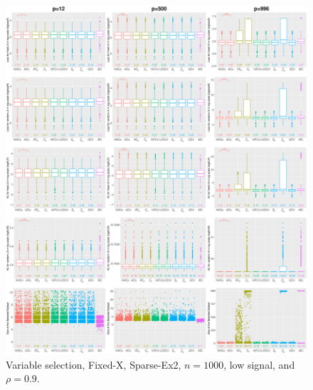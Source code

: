 \begin{figure}[!ht]
\centering
\includegraphics[width=\textwidth]{figures/supplement/fixedx/subset_selection/Sparse-Ex2_n1000_lsnr_rho09.eps}
\caption{Variable selection, Fixed-X, Sparse-Ex2, $n=1000$, low signal, and $\rho=0.9$.}
\end{figure}
\clearpage
